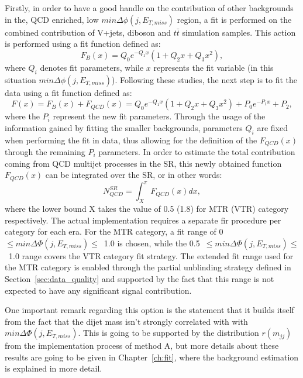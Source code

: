 \hspace{10pt} Firstly, in order to have a good handle on the contribution of other backgrounds in the, QCD enriched, low $min\Delta\phi(j, E_{T, miss})$ region, a fit is performed on the combined contribution of V+jets, diboson and $t\bar{t}$ simulation samples. This action is performed using a fit function defined as:
\begin{equation}
    F_B(x)  = Q_0e^{-Q_1x}(1+Q_2x+Q_3x^2),
\end{equation}
where $Q_i$ denotes fit parameters, while $x$ represents the fit variable (in this situation $min\Delta\phi(j, E_{T, miss})$). Following these studies, the next step is to fit the data using a fit function defined as:
\begin{equation}
    F(x) = F_B(x)+F_{QCD}(x) = Q_0e^{-Q_1x}(1+Q_2x+Q_3x^2)+P_0e^{-P_1x}+P_2,
\end{equation}
where the $P_i$ represent the new fit parameters. Through the usage of the information gained by fitting the smaller backgrounds, parameters $Q_i$ are fixed when performing the fit in data, thus allowing for the definition of the $F_{QCD}(x)$ through the remaining $P_i$ parameters. In order to estimate the total contribution coming from QCD multijet processes in the SR, this newly obtained function $F_{QCD}(x)$ can be integrated over the SR, or in other words:
\begin{equation}
    N_{QCD}^{SR} = \int_X^{\pi}F_{QCD}(x)dx,
\end{equation}
where the lower bound X takes the value of 0.5 (1.8) for MTR (VTR) category respectively. The actual implementation requires a separate fir procedure per category for each era. For the MTR category, a fit range of 0~$\leq min\Delta\Phi(j,E_{T,miss})\leq$~1.0 is chosen, while the 0.5~$\leq min\Delta\Phi(j,E_{T,miss})\leq$~1.0 range covers the VTR category fit strategy. The extended fit range used for the MTR category is enabled through the partial unblinding strategy defined in Section~\ref{sec:data_quality} and supported by the fact that this range is not expected to have any significant signal contribution.

\hspace{10pt} One important remark regarding this option is the statement that it builds itself from the fact that the dijet mass isn't strongly correlated with with $min\Delta\Phi(j,E_{T,miss})$. This is going to be supported by the distribution $r(m_{jj})$ from the implementation process of method A, but more details about these results are going to be given in Chapter~\ref{ch:fit}, where the background estimation is explained in more detail.

